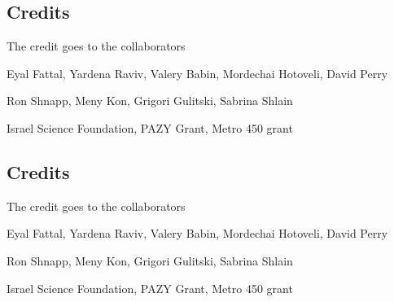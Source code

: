 \documentclass[aspectratio=43]{beamer}
\begin{document}
\subsection{Credits}

\begin{frame}[label=credit-1a]{The credit goes to the collaborators }
\begin{multicols}{2}
\centering
{} 
\end{multicols}
\end{frame}
%
\begin{frame}[label=credit-2]
\begin{card}
Eyal Fattal, Yardena Raviv, Valery Babin, Mordechai Hotoveli, David Perry
\end{card}
\begin{card}[TAU]
Ron Shnapp, Meny Kon, Grigori Gulitski, Sabrina Shlain
\end{card}
\begin{card}[Funding]
Israel Science Foundation, PAZY Grant, Metro 450 grant
\end{card}
\end{frame}
%

\subsection{Credits}

\begin{frame}[label=credit-1]{The credit goes to the collaborators }
\begin{multicols}{2}
\centering
{} 
\end{multicols}
\end{frame}
%
\begin{frame}[label=credit-2]
\begin{card}
Eyal Fattal, Yardena Raviv, Valery Babin, Mordechai Hotoveli, David Perry
\end{card}
\begin{card}[TAU]
Ron Shnapp, Meny Kon, Grigori Gulitski, Sabrina Shlain
\end{card}
\begin{card}[Funding]
Israel Science Foundation, PAZY Grant, Metro 450 grant
\end{card}
\end{frame}
%
\end{document}

